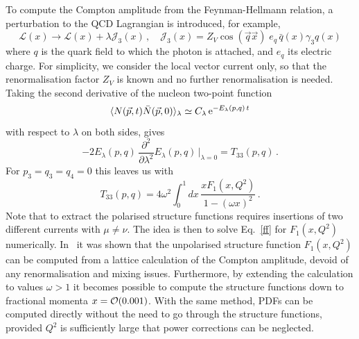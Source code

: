 To compute the Compton amplitude from the Feynman-Hellmann relation, a perturbation to the QCD Lagrangian is introduced, for example,
\begin{equation}
\mathcal{L}(x) \rightarrow \mathcal{L}(x) + \lambda \mathcal{J}_3(x)\,, \quad \mathcal{J}_3(x)=Z_V\cos(\vec{q}\vec{x})\; e_q \,\bar{q}(x)\gamma_3 q(x) 
\label{in}
\end{equation}
where $q$ is the quark field to which the photon is attached, and $e_q$ its electric charge. For simplicity, we consider the local vector current only, so that the renormalisation factor $Z_V$ is known and no further renormalisation is needed. Taking the second derivative of the nucleon two-point function 
\begin{equation}
\langle N(\vec{p},t) \bar{N}(\vec{p},0)\rangle_\lambda \simeq C_\lambda\, {\rm e}^{-E_\lambda(p,q)\,t}
\end{equation}
with respect to $\lambda$ on both sides, gives
\begin{equation}
-2 E_\lambda(p,q)\, \frac{\partial^2}{\partial\lambda^2}  E_\lambda(p,q)\,\big|_{\lambda=0} = T_{33}(p,q) \,.
\end{equation}
For $p_3=q_3=q_4=0$ this leaves us with
\begin{equation}
T_{33}(p,q) = 4 \omega^2 \int_0^1 dx\,  \frac{xF_1(x,Q^2)}{1-(\omega x)^2} \,.
\label{ff}
\end{equation}
Note that to extract the polarised structure functions requires insertions of two different currents with $\mu\neq \nu$. The idea is then to solve Eq.~\eqref{ff} for $F_1(x,Q^2)$ numerically.
%
In~\cite{Ji:2001wha,Chambers:2017dov} it was shown that the unpolarised structure function $F_1(x,Q^2)$ can be computed from a lattice calculation of the Compton 
amplitude, devoid of any renormalisation and mixing issues. Furthermore, by extending the calculation to values $\omega > 1$ it becomes possible
to compute the structure functions down to fractional momenta $x = {\cal O}(0.001)$. With the same method, PDFs can be computed directly without the need to go through the structure functions, provided $Q^2$ is sufficiently large that power corrections can be neglected. 

